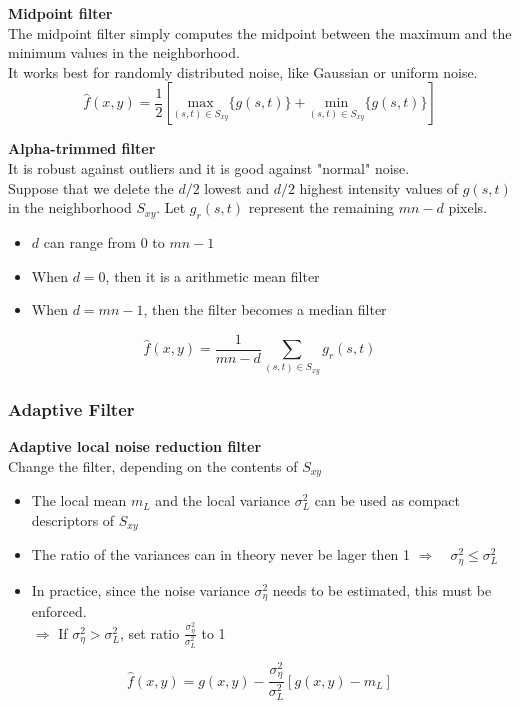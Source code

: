\textbf{Midpoint filter}\\
The midpoint filter simply computes the midpoint between the maximum and the minimum values in the neighborhood. \\
It works best for randomly distributed noise, like Gaussian or uniform noise.
\begin{equation}
	\hat{f}(x,y)=\frac{1}{2} \left[ \underset{(s,t) \in S_{xy}}{\text{max}}\{g(s,t) \} + \underset{(s,t) \in S_{xy}}{\text{min}}\{g(s,t) \}\right]
\end{equation}

\textbf{Alpha-trimmed filter}\\
It is robust against outliers and it is good against "normal" noise.\\ 

Suppose that we delete the $d/2$ lowest and $d/2$ highest intensity values of $g(s,t)$ in the neighborhood $S_{xy}$. Let $g_r(s,t)$ represent the remaining $mn-d$ pixels.
\begin{itemize}
	\item $d$ can range from 0 to $mn-1$
	\item When $d=0$, then it is a arithmetic mean filter
	\item When $d=mn-1$, then the filter becomes a median filter
\end{itemize}
\begin{equation}
	\hat{f}(x,y)=\frac{1}{mn-d} \sum\limits_{(s,t)\in S_{xy}} g_r(s,t)
\end{equation}

\subsubsection{Adaptive Filter }
\textbf{Adaptive local noise reduction filter}\\
Change the filter, depending on the contents of $S_{xy}$
\begin{itemize}
	\item The local mean $m_L$ and the local variance $\sigma_{L}^2$ can be used as compact descriptors of $S_{xy}$
	\item The ratio of the variances can in theory never be lager then 1 $\Rightarrow \quad\sigma_{\eta}^2 \le \sigma_{L}^2$
	\item In practice, since the noise variance $\sigma_{\eta}^2$ needs to be estimated, this must be enforced.\\
	$\Rightarrow$ If $\sigma_{\eta}^2 > \sigma_{L}^2$, set ratio $\frac{\sigma_{\eta}^2}{\sigma_{L}^2}$ to 1
\end{itemize}
\begin{equation}
	\hat{f}(x,y)=g(x,y) - \frac{\sigma_{\eta}^2}{\sigma_{L}^2} \left[g(x,y)-m_L \right]
\end{equation}


